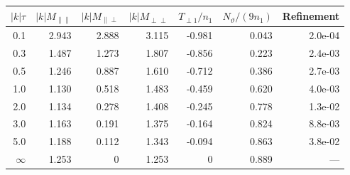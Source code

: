 \begin{tabular}{rrrrrrr}\toprule
$|k|\tau$ & $|k|M_{\parallel\parallel}$ & $|k|M_{\parallel\perp}$ & $|k|M_{\perp\perp}$ & $T_{\perp1}/n_1$ & $N_\vartheta/(9n_1)$ & Refinement\\\midrule
0.1 & 2.943 & 2.888 & 3.115 & -0.981 & 0.043 & 2.0e-04 \\
0.3 & 1.487 & 1.273 & 1.807 & -0.856 & 0.223 & 2.4e-03 \\
0.5 & 1.246 & 0.887 & 1.610 & -0.712 & 0.386 & 2.7e-03 \\
1.0 & 1.130 & 0.518 & 1.483 & -0.459 & 0.620 & 4.0e-03 \\
2.0 & 1.134 & 0.278 & 1.408 & -0.245 & 0.778 & 1.3e-02 \\
3.0 & 1.163 & 0.191 & 1.375 & -0.164 & 0.824 & 8.8e-03 \\
5.0 & 1.188 & 0.112 & 1.343 & -0.094 & 0.863 & 3.8e-02 \\
\midrule
$\infty$ & 1.253 & 0 & 1.253 & 0 & 0.889 & --- \\
\bottomrule\end{tabular}
